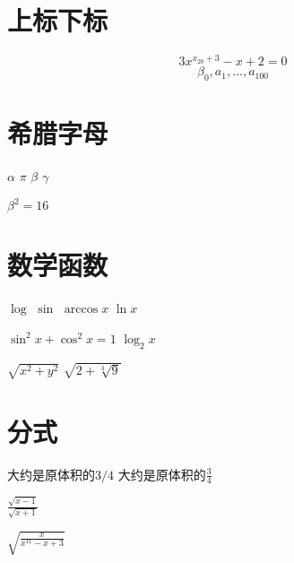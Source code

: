 \documentclass{article}
\begin{document}
	\section{上标下标}
	$$3x^{x_{20} + 3} - x + 2 = 0$$
	$$\beta_0,a_1,...,a_{100}$$
	\section{希腊字母} 
	$\alpha$
	$\pi$
	$\beta$
	$\gamma$

	$\beta^2 = 16$

	\section{数学函数}
	$\log$
	$\sin$
	$\arccos x$
	$\ln x$

	$\sin^2 x+\cos^2 x = 1$
	$\log_2 x$

	$\sqrt{x ^ 2 + y ^ 2}$
	$\sqrt{2 + \sqrt[3]{9}}$ %

	\section{分式}
	大约是原体积的$3/4$
	大约是原体积的$\frac{3}{4}$

	$\frac{\sqrt{x-1}}{\sqrt{x+1}}$

	$\sqrt{\frac{x}{x^{11} - x + 3}}$
\end{document}
